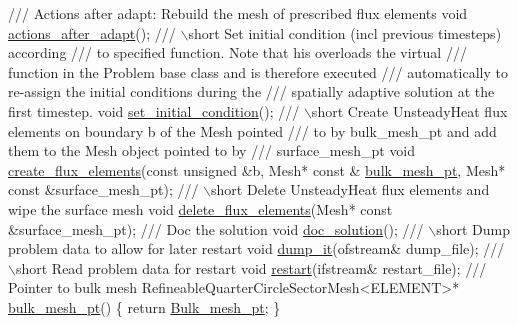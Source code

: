 \begin{DoxyCodeInclude}
 \textcolor{comment}{}
\textcolor{comment}{ /// Actions after adapt: Rebuild the mesh of prescribed flux elements}
\textcolor{comment}{} \textcolor{keywordtype}{void} \hyperlink{classRefineableUnsteadyHeatProblem_a1f8a9e91269440c799a2075f989d62b1}{actions\_after\_adapt}();
\textcolor{comment}{}
\textcolor{comment}{ /// \(\backslash\)short Set initial condition (incl previous timesteps) according}
\textcolor{comment}{ /// to specified function. Note that his overloads the virtual}
\textcolor{comment}{ /// function in the Problem base class and is therefore executed }
\textcolor{comment}{ /// automatically to re-assign the initial conditions during the }
\textcolor{comment}{ /// spatially adaptive solution at the first timestep.}
\textcolor{comment}{} \textcolor{keywordtype}{void} \hyperlink{classRefineableUnsteadyHeatProblem_a30e2e1d62b059982f7014b74f4fe2be9}{set\_initial\_condition}();
\textcolor{comment}{}
\textcolor{comment}{ /// \(\backslash\)short Create UnsteadyHeat flux elements on boundary b of the Mesh pointed}
\textcolor{comment}{ /// to by bulk\_mesh\_pt and add them to the Mesh object pointed to by }
\textcolor{comment}{ /// surface\_mesh\_pt}
\textcolor{comment}{} \textcolor{keywordtype}{void} \hyperlink{classRefineableUnsteadyHeatProblem_a65601ec64c73ac578b43f4af04c46569}{create\_flux\_elements}(\textcolor{keyword}{const} \textcolor{keywordtype}{unsigned} &b, Mesh* \textcolor{keyword}{const} &
      \hyperlink{classRefineableUnsteadyHeatProblem_a4d8eec1505a3c53960a3182ec462b4e7}{bulk\_mesh\_pt},
                           Mesh* \textcolor{keyword}{const} &surface\_mesh\_pt);
\textcolor{comment}{}
\textcolor{comment}{ /// \(\backslash\)short Delete UnsteadyHeat flux elements and wipe the surface mesh}
\textcolor{comment}{} \textcolor{keywordtype}{void} \hyperlink{classRefineableUnsteadyHeatProblem_ad2e53af5c385e44e33e400b430b610e8}{delete\_flux\_elements}(Mesh* \textcolor{keyword}{const} &surface\_mesh\_pt);
\textcolor{comment}{}
\textcolor{comment}{ /// Doc the solution}
\textcolor{comment}{} \textcolor{keywordtype}{void} \hyperlink{classRefineableUnsteadyHeatProblem_a77d590171785b6b5f4070af9401c0e37}{doc\_solution}();
\textcolor{comment}{}
\textcolor{comment}{ /// \(\backslash\)short Dump problem data to allow for later restart}
\textcolor{comment}{} \textcolor{keywordtype}{void} \hyperlink{classRefineableUnsteadyHeatProblem_a1fb939c3f9c258fd49328bb1516ced98}{dump\_it}(ofstream& dump\_file);
\textcolor{comment}{}
\textcolor{comment}{ /// \(\backslash\)short Read problem data for restart}
\textcolor{comment}{} \textcolor{keywordtype}{void} \hyperlink{classRefineableUnsteadyHeatProblem_af36fa71e72852367411e21b50b179625}{restart}(ifstream& restart\_file);
\textcolor{comment}{}
\textcolor{comment}{ /// Pointer to bulk mesh}
\textcolor{comment}{} RefineableQuarterCircleSectorMesh<ELEMENT>* \hyperlink{classRefineableUnsteadyHeatProblem_a4d8eec1505a3c53960a3182ec462b4e7}{bulk\_mesh\_pt}()
  \{
   \textcolor{keywordflow}{return} \hyperlink{classRefineableUnsteadyHeatProblem_afade341e03a4c97e62444c80adc9552f}{Bulk\_mesh\_pt};
  \}



\end{DoxyCodeInclude}
